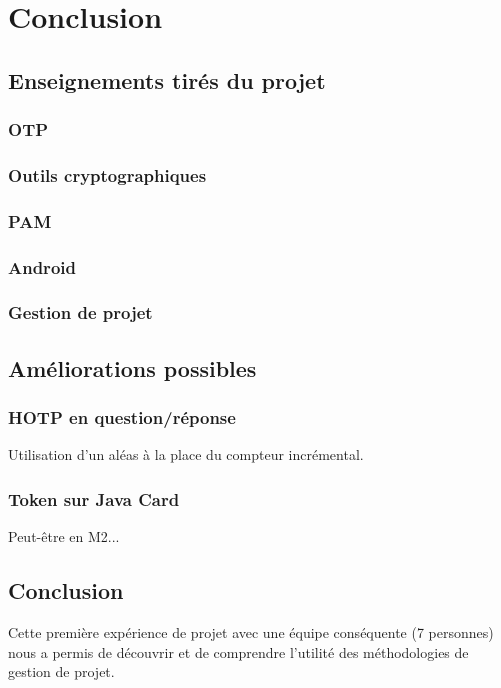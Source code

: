 \chapter{Conclusion}

\section{Enseignements tirés du projet}

\subsection{OTP}
\subsection{Outils cryptographiques}
\subsection{PAM} 
\subsection{Android}
\subsection{Gestion de projet}





\section{Améliorations possibles}
\subsection{HOTP en question/réponse}
Utilisation d'un aléas à la place du compteur incrémental.

\subsection{Token sur Java Card}
Peut-être en M2...



\section{Conclusion}

Cette première expérience de projet avec une équipe conséquente (7 personnes) nous a permis de découvrir et de comprendre l'utilité des méthodologies de gestion de projet.

